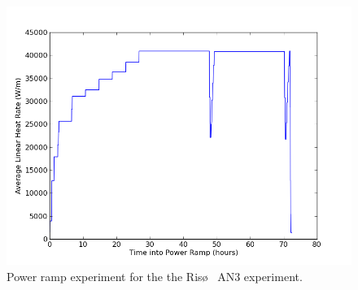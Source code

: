 \begin{figure}
\caption{\label{fig:riso_power_ramp}
Power ramp experiment for the the Ris\o~ AN3 experiment.}
 \begin{center}
  \includegraphics[scale=.75]{./Ongoing_Work/power_ramp.png}
 \end{center}
\end{figure} 

